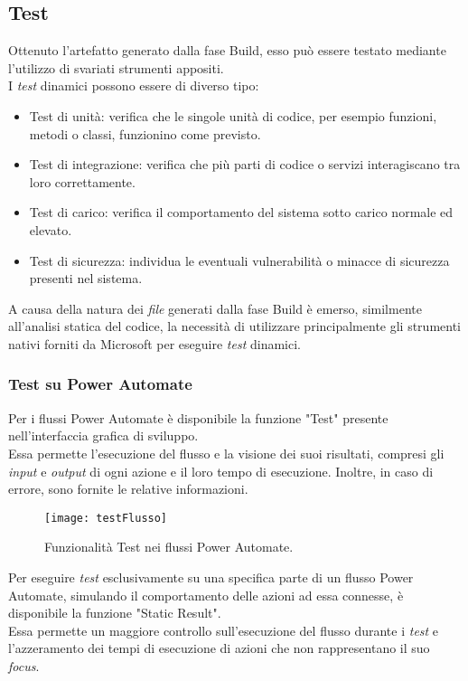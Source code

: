 \subsection{Test}
Ottenuto l'artefatto generato dalla fase Build, esso può essere testato mediante l'utilizzo di svariati strumenti appositi.\\
I \emph{test} dinamici possono essere di diverso tipo: 
\begin{itemize}
    \item Test di unità: verifica che le singole unità di codice, per esempio funzioni, metodi o classi, funzionino come previsto.
    \item Test di integrazione: verifica che più parti di codice o servizi interagiscano tra loro correttamente.
    \item Test di carico: verifica il comportamento del sistema sotto carico normale ed elevato.
    \item Test di sicurezza: individua le eventuali vulnerabilità o minacce di sicurezza presenti nel sistema. 
\end{itemize}

A causa della natura dei \emph{file} generati dalla fase Build è emerso, similmente all'analisi statica del codice, la necessità di utilizzare principalmente gli strumenti nativi forniti da Microsoft per eseguire \emph{test} dinamici.\\

\subsubsection*{Test su Power Automate}
Per i flussi Power Automate è disponibile la funzione "Test" presente nell'interfaccia grafica di sviluppo.\\
Essa permette l'esecuzione del flusso e la visione dei suoi risultati, compresi gli \emph{input} e \emph{output} di ogni azione e il loro tempo di esecuzione. 
Inoltre, in caso di errore, sono fornite le relative informazioni. 
\begin{figure}[htbp] 
    \centering 
    \texttt{[image: testFlusso]} 
    \caption{Funzionalità Test nei flussi Power Automate.}
    \label{fig:testFlusso}
\end{figure}

\newpage \noindent Per eseguire \emph{test} esclusivamente su una specifica parte di un flusso Power Automate, simulando il comportamento delle azioni ad essa connesse, è disponibile la funzione "Static Result".\\
Essa permette un maggiore controllo sull'esecuzione del flusso durante i \emph{test} e l'azzeramento dei tempi di esecuzione di azioni che non rappresentano il suo \emph{focus}.\\

